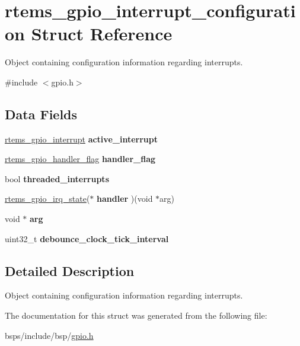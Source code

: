 \hypertarget{structrtems__gpio__interrupt__configuration}{}\section{rtems\+\_\+gpio\+\_\+interrupt\+\_\+configuration Struct Reference}
\label{structrtems__gpio__interrupt__configuration}


Object containing configuration information regarding interrupts.  




{\ttfamily \#include $<$gpio.\+h$>$}

\subsection*{Data Fields}
\begin{DoxyCompactItemize}
\item 
\mbox{\label{structrtems__gpio__interrupt__configuration_ae64bee2f11a61ecc3b78ca191fae4e48}} 
\mbox{\hyperlink{gpio_8h_a941c7497a28a335b0b05e1ebfd471ddc}{rtems\+\_\+gpio\+\_\+interrupt}} {\bfseries active\+\_\+interrupt}
\item 
\mbox{\label{structrtems__gpio__interrupt__configuration_a969c222f3b2411085b9b5894515572b9}} 
\mbox{\hyperlink{gpio_8h_a5c0bd60f2caeb36c424b17c888331b8f}{rtems\+\_\+gpio\+\_\+handler\+\_\+flag}} {\bfseries handler\+\_\+flag}
\item 
\mbox{\label{structrtems__gpio__interrupt__configuration_a284f609c68f48b11cbbe492cb0322897}} 
bool {\bfseries threaded\+\_\+interrupts}
\item 
\mbox{\label{structrtems__gpio__interrupt__configuration_ad97e55e614fee7b33faf6fbf387d5816}} 
\mbox{\hyperlink{gpio_8h_a22ef6f3b12eae878a51eaf96f72437ea}{rtems\+\_\+gpio\+\_\+irq\+\_\+state}}($\ast$ {\bfseries handler} )(void $\ast$arg)
\item 
\mbox{\label{structrtems__gpio__interrupt__configuration_a0bf9639f4360f3cc76af0527d3a246cd}} 
void $\ast$ {\bfseries arg}
\item 
\mbox{\label{structrtems__gpio__interrupt__configuration_a47c63fcf95256747d0eebaf3acfde19a}} 
uint32\+\_\+t {\bfseries debounce\+\_\+clock\+\_\+tick\+\_\+interval}
\end{DoxyCompactItemize}


\subsection{Detailed Description}
Object containing configuration information regarding interrupts. 

The documentation for this struct was generated from the following file\+:\begin{DoxyCompactItemize}
\item 
bsps/include/bsp/\mbox{\hyperlink{gpio_8h}{gpio.\+h}}\end{DoxyCompactItemize}
